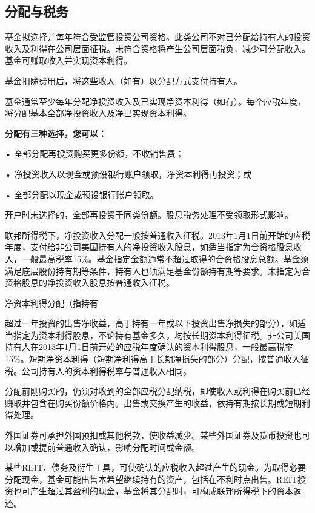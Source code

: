 \documentclass[UTF8,fontset=none,11pt,a4paper]{ctexart}
\begin{document}
\subsection*{分配与税务}\label{unitU791}
基金拟选择并每年符合受监管投资公司资格。此类公司不对已分配给持有人的投资收入及利得在公司层面征税。未符合资格将产生公司层面税负，减少可分配收入。基金可赚取收入并实现\allowbreak\mbox{资本利得。}

基金扣除费用后，将这些收入（如有）以分配方式支\allowbreak\mbox{付持有人。}

基金通常至少每年分配净投资收入及已实现净资本利得（如有）。每个应税年度，将分配基本全部净投资收入及净已实现\allowbreak\mbox{资本利得。}

\textbf{分配有三种选择，您可以：}

\noindent • 全部分配再投资购买更多份额，不\allowbreak\mbox{收销售费；}\par\smallskip
\noindent • 净投资收入以现金或预设银行账户领取，净资本利得再投资；或\par\smallskip
\noindent • 全部分配以现金或预设银行\allowbreak\mbox{账户领取。}\par\smallskip
开户时未选择的，全部再投资于同类份额。股息税务处理不受领取\allowbreak\mbox{形式影响。}

联邦所得税下，净投资收入分配一般按普通收入征税。2013年1月1日前开始的应税年度，支付给非公司美国持有人的净投资收入股息，如适当指定为合资格股息收入，一般最高税率15\%。基金指定金额通常不超过取得的合资格股息总额。基金须满足底层股份持有期等条件，持有人也须满足基金份额持有期等要求。未指定为合资格股息的净投资收入股息按普通\allowbreak\mbox{收入征税。}

净资本利得分配（指持有

超过一年投资的出售净收益，高于持有一年或以下投资出售净损失的部分），如适当指定为资本利得股息，不论持有基金多久，均按长期资本利得征税。非公司美国持有人在2013年1月1日前开始的应税年度确认的资本利得股息，一般最高税率15\%。短期净资本利得（短期净利得高于长期净损失的部分）分配，按普通收入征税。公司持有人的资本利得税率与普通\allowbreak\mbox{收入相同。}

分配前刚购买的，仍须对收到的全部应税分配纳税，即使收入或利得在购买前已经赚取并包含在购买份额价格内。出售或交换产生的收益，依持有期按长期或短期\allowbreak\mbox{利得处理。}

外国证券可承担外国预扣或其他税款，使收益减少。某些外国证券及货币投资也可以增加或提前普通收入确认，影响分配时\allowbreak\mbox{间或金额。}

某些REIT、债务及衍生工具，可使确认的应税收入超过产生的现金。为取得必要分配现金，基金可能出售本希望继续持有的资产，包括在不利时点出售。REIT投资也可产生超过其盈利的现金，基金将其分配时，可构成联邦所得税下的\allowbreak\mbox{资本返还。}
\end{document}
